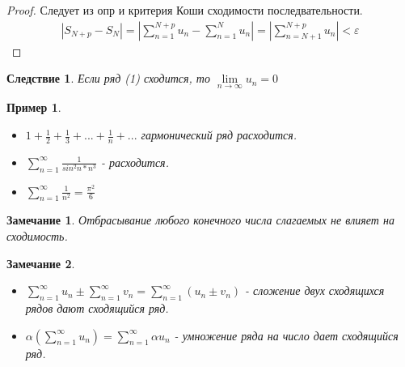 \documentclass[12pt, oneside]{article}
\theoremstyle{plain}
\newtheorem{Corollary}{Следствие}
\newtheorem{Example}{Пример}
\newtheorem{Note}{Замечание}
\newcommand{\llim}{\lim\limits}
\newcommand{\lsum}{\sum\limits}
\begin{document}
	\begin{proof}
		Следует из опр и критерия Коши сходимости последвательности.
		\begin{equation}
		\begin{split}
			|S_{N +p} - S_N| =
			\left| \sum_{n = 1}^{N + p} u_n - \sum_{n = 1}^{N} u_n \right| = 
			\left|\sum_{n=N+1}^{N+p} u_n \right| < \varepsilon
			\nonumber
		\end{split}
		\end{equation}
	\end{proof}
	\begin{Corollary}
		Если ряд (1) сходится, то \(\llim_{n\to\infty} u_n = 0\)
	\end{Corollary}
	\begin{Example} \
		\begin{itemize} 
			\item \(1 + \frac{1}{2} + \frac{1}{3} + ... + \frac{1}{n} + ... \) 
				гармонический ряд расходится.
			\item \(\lsum_{n=1}^{\infty} \frac{1}{sin^2 n * n^3}\) - расходится.

			\item \(\lsum_{n = 1}^{\infty} \frac{1}{n^2} = \frac{\pi^2}{6}\)
	\end{itemize}
	\end{Example}
	\begin{Note}
		Отбрасывание любого конечного числа слагаемых не влияет на сходимость.
	\end{Note}
	\begin{Note}  \
		\begin{itemize}
			\item \(\lsum_{n=1}^{\infty} u_n \pm \lsum_{n=1}^{\infty} v_n =
				\lsum_{n=1}^{\infty} (u_n \pm v_n) \) - 
				сложение двух сходящихся рядов дают сходящийся ряд.
			\item \(\alpha(\lsum_{n=1}^{\infty} u_n) = \lsum_{n=1}^{\infty} \alpha u_n\) - умножение ряда на число дает сходящийся ряд.
		\end{itemize}
	\end{Note}
\end{document}

